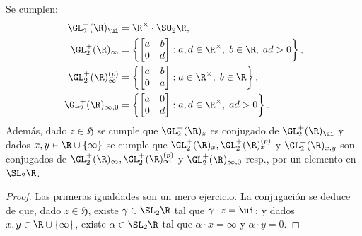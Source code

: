 \documentclass[teoria-numeros.tex]{subfiles}
\begin{document}
\begin{prop}\label{thm:stab_calculations}
	Se cumplen:
	\begin{align*}
		\GL_2^+(\R)_\ui &= \R^\times \cdot \SO_2\R, \\
		\GL_2^+(\R)_\infty &= \left\{
			\begin{bmatrix}
				a & b \\
				0 & d
			\end{bmatrix} : a, d \in \R^\times, \; b \in \R, \; ad > 0
		\right\}, \\
		\GL_2^+(\R)_\infty^{(p)} &= \left\{
			\begin{bmatrix}
				a & b \\
				0 & a
			\end{bmatrix} : a \in \R^\times, \; b \in \R
		\right\}, \\
		\GL_2^+(\R)_{\infty, 0} &= \left\{
			\begin{bmatrix}
				a & 0 \\
				0 & d
			\end{bmatrix} : a, d \in \R^\times, \; ad > 0
		\right\}.
	\end{align*}
	Además, dado $z \in \mathfrak{H}$ se cumple que $\GL_2^+(\R)_z$ es conjugado de $\GL_2^+(\R)_\ui$
	y dados $x, y \in \R\cup\{ \infty \}$ se cumple que $\GL_2^+(\R)_x, \GL_2^+(\R)_x^{(p)}$ y $\GL_2^+(\R)_{x, y}$
	son conjugados de $\GL_2^+(\R)_\infty, \GL_2^+(\R)_\infty^{(p)}$ y $\GL_2^+(\R)_{\infty, 0}$ resp., por un elemento en $\SL_2\R$.
\end{prop}
\begin{proof}
	Las primeras igualdades son un mero ejercicio.
	La conjugación se deduce de que, dado $z \in \mathfrak{H}$, existe $\gamma \in \SL_2\R$ tal que $\gamma\cdot z = \ui$;
	y dados $x, y \in \R \cup \{ \infty \}$, existe $\alpha \in \SL_2\R$ tal que $\alpha\cdot x = \infty$ y $\alpha\cdot y = 0$.
\end{proof}
\end{document}
